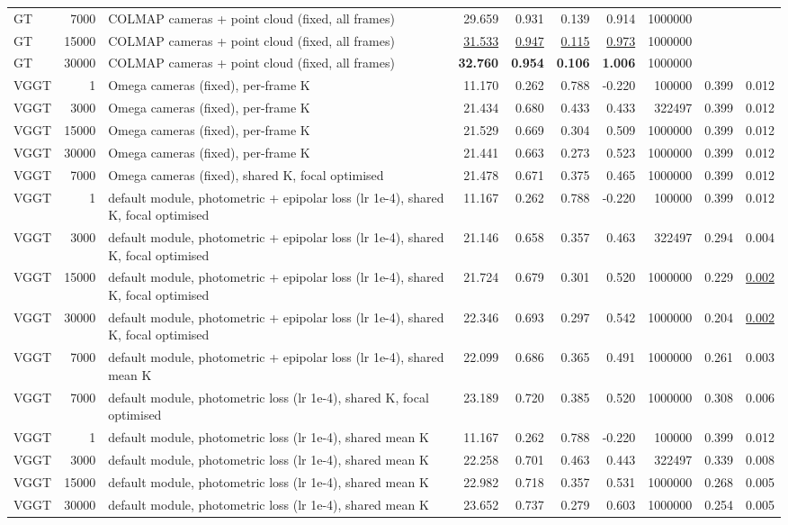 \begin{table}[H]
\begin{tabular}{lrlrrrrrrr}
GT & 7000 & COLMAP cameras + point cloud (fixed, all frames) & 29.659 & 0.931 & 0.139 & 0.914 & 1000000 &  &  \\
GT & 15000 & COLMAP cameras + point cloud (fixed, all frames) & \underline{31.533} & \underline{0.947} & \underline{0.115} & \underline{0.973} & 1000000 &  &  \\
GT & 30000 & COLMAP cameras + point cloud (fixed, all frames) & \textbf{32.760} & \textbf{0.954} & \textbf{0.106} & \textbf{1.006} & 1000000 &  &  \\
VGGT & 1 & Omega cameras (fixed), per-frame K & 11.170 & 0.262 & 0.788 & -0.220 & 100000 & 0.399 & 0.012 \\
VGGT & 3000 & Omega cameras (fixed), per-frame K & 21.434 & 0.680 & 0.433 & 0.433 & 322497 & 0.399 & 0.012 \\
VGGT & 15000 & Omega cameras (fixed), per-frame K & 21.529 & 0.669 & 0.304 & 0.509 & 1000000 & 0.399 & 0.012 \\
VGGT & 30000 & Omega cameras (fixed), per-frame K & 21.441 & 0.663 & 0.273 & 0.523 & 1000000 & 0.399 & 0.012 \\
VGGT & 7000 & Omega cameras (fixed), shared K, focal optimised & 21.478 & 0.671 & 0.375 & 0.465 & 1000000 & 0.399 & 0.012 \\
VGGT & 1 & default module, photometric + epipolar loss (lr 1e-4), shared K, focal optimised & 11.167 & 0.262 & 0.788 & -0.220 & 100000 & 0.399 & 0.012 \\
VGGT & 3000 & default module, photometric + epipolar loss (lr 1e-4), shared K, focal optimised & 21.146 & 0.658 & 0.357 & 0.463 & 322497 & 0.294 & 0.004 \\
VGGT & 15000 & default module, photometric + epipolar loss (lr 1e-4), shared K, focal optimised & 21.724 & 0.679 & 0.301 & 0.520 & 1000000 & 0.229 & \underline{0.002} \\
VGGT & 30000 & default module, photometric + epipolar loss (lr 1e-4), shared K, focal optimised & 22.346 & 0.693 & 0.297 & 0.542 & 1000000 & 0.204 & \underline{0.002} \\
VGGT & 7000 & default module, photometric + epipolar loss (lr 1e-4), shared mean K & 22.099 & 0.686 & 0.365 & 0.491 & 1000000 & 0.261 & 0.003 \\
VGGT & 7000 & default module, photometric loss (lr 1e-4), shared K, focal optimised & 23.189 & 0.720 & 0.385 & 0.520 & 1000000 & 0.308 & 0.006 \\
VGGT & 1 & default module, photometric loss (lr 1e-4), shared mean K & 11.167 & 0.262 & 0.788 & -0.220 & 100000 & 0.399 & 0.012 \\
VGGT & 3000 & default module, photometric loss (lr 1e-4), shared mean K & 22.258 & 0.701 & 0.463 & 0.443 & 322497 & 0.339 & 0.008 \\
VGGT & 15000 & default module, photometric loss (lr 1e-4), shared mean K & 22.982 & 0.718 & 0.357 & 0.531 & 1000000 & 0.268 & 0.005 \\
VGGT & 30000 & default module, photometric loss (lr 1e-4), shared mean K & 23.652 & 0.737 & 0.279 & 0.603 & 1000000 & 0.254 & 0.005 \\
\bottomrule
\end{tabular}
\end{table}